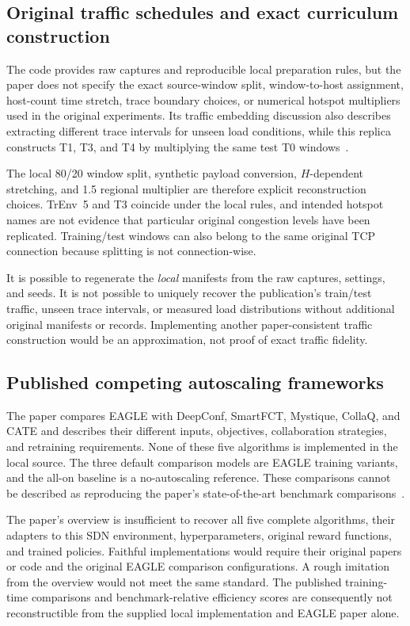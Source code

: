 \documentclass[11pt,a4paper]{article}
\begin{document}
\subsection{Original traffic schedules and exact curriculum construction}

The code provides raw captures and reproducible local preparation rules, but
the paper does not specify the exact source-window split, window-to-host
assignment, host-count time stretch, trace boundary choices, or numerical
hotspot multipliers used in the original experiments. Its traffic embedding
discussion also describes extracting different trace intervals for unseen
load conditions, while this replica constructs T1, T3, and T4 by multiplying
the same test T0 windows~\cite{paper,code-data}.

The local 80/20 window split, synthetic payload conversion, $H$-dependent
stretching, and 1.5 regional multiplier are therefore explicit reconstruction
choices. TrEnv~5 and T3 coincide under the local rules, and intended hotspot
names are not evidence that particular original congestion levels have been
replicated. Training/test windows can also belong to the same original TCP
connection because splitting is not connection-wise.

It is possible to regenerate the \emph{local} manifests from the raw captures,
settings, and seeds. It is not possible to uniquely recover the publication's
train/test traffic, unseen trace intervals, or measured load distributions
without additional original manifests or records. Implementing another
paper-consistent traffic construction would be an approximation, not proof
of exact traffic fidelity.

\subsection{Published competing autoscaling frameworks}

The paper compares EAGLE with DeepConf, SmartFCT, Mystique, CollaQ, and CATE
and describes their different inputs, objectives, collaboration strategies,
and retraining requirements. None of these five algorithms is implemented
in the local source. The three default comparison models are EAGLE training
variants, and the all-on baseline is a no-autoscaling reference. These
comparisons cannot be described as reproducing the paper's state-of-the-art
benchmark comparisons~\cite{paper,code-evaluation,code-eval-entrypoints}.

The paper's overview is insufficient to recover all five complete algorithms,
their adapters to this SDN environment, hyperparameters, original reward
functions, and trained policies. Faithful implementations would require their
original papers or code and the original EAGLE comparison configurations.
A rough imitation from the overview would not meet the same standard. The
published training-time comparisons and benchmark-relative efficiency scores
are consequently not reconstructible from the supplied local implementation
and EAGLE paper alone.
\end{document}
